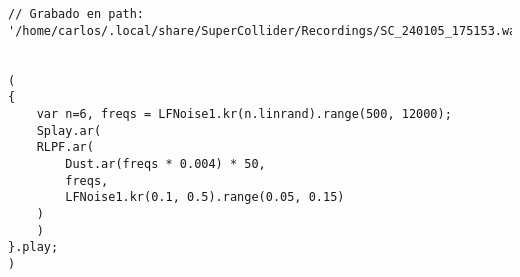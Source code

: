 \begin{minipage}[t]{1\textwidth}
    \centering
    \begin{lstlisting}[style=SuperCollider-IDE, basicstyle=\footnotesize\ttfamily, numbers=none]
// Grabado en path: '/home/carlos/.local/share/SuperCollider/Recordings/SC_240105_175153.wav'


(
{
    var n=6, freqs = LFNoise1.kr(n.linrand).range(500, 12000);
    Splay.ar(
    RLPF.ar(
        Dust.ar(freqs * 0.004) * 50,
        freqs,
        LFNoise1.kr(0.1, 0.5).range(0.05, 0.15)
    )
    )
}.play;
)                                          
    \end{lstlisting}
    \vspace{1cm}
\end{minipage}

















